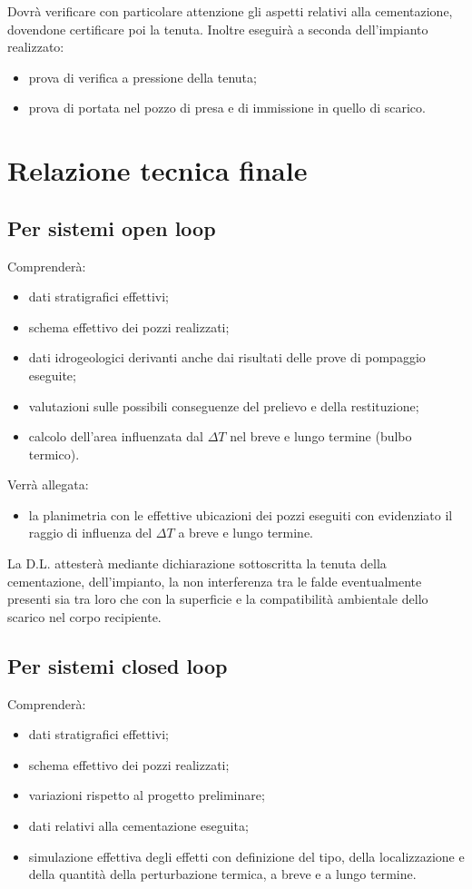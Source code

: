 Dovrà verificare con particolare attenzione gli aspetti relativi alla cementazione, dovendone certificare poi la tenuta. Inoltre eseguirà a seconda dell'impianto realizzato:
\begin{itemize}
\item prova di verifica a pressione della tenuta;
\item prova di portata nel pozzo di presa e di immissione in quello di scarico.
\end{itemize}

\newpage
\section{Relazione tecnica finale}
\subsection{Per sistemi open loop}
Comprenderà:
\begin{itemize}
\item dati stratigrafici effettivi;
\item schema effettivo dei pozzi realizzati;
\item dati idrogeologici derivanti anche dai risultati delle prove di pompaggio eseguite;
\item valutazioni sulle possibili conseguenze del prelievo e della restituzione;
\item calcolo dell'area influenzata dal $\Delta T$ nel breve e lungo termine (bulbo termico).
\end{itemize}

Verrà allegata:
\begin{itemize}
\item la planimetria con le effettive ubicazioni dei pozzi eseguiti con evidenziato il raggio di influenza del $\Delta T$ a breve e lungo termine.
\end{itemize}

La D.L. attesterà mediante dichiarazione sottoscritta la tenuta della cementazione, dell'impianto, la non interferenza tra le falde eventualmente presenti sia tra loro che con la superficie e la compatibilità ambientale dello scarico nel corpo recipiente.

\subsection{Per sistemi closed loop}
Comprenderà:
\begin{itemize}
\item dati stratigrafici effettivi;
\item schema effettivo dei pozzi realizzati;
\item variazioni rispetto al progetto preliminare;
\item dati relativi alla cementazione eseguita;
\item simulazione effettiva degli effetti con definizione del tipo, della localizzazione e della quantità della perturbazione termica, a breve e a lungo termine.
\end{itemize}

